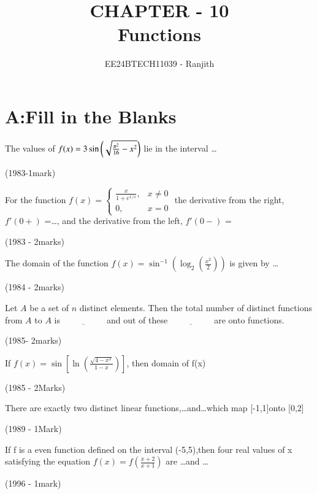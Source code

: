 \documentclass[journal,12pt,twocolumn]{IEEEtran}
\theoremstyle{remark}
\begin{document}

\vspace{3cm}

\title{CHAPTER - 10\\Functions}
\author{EE24BTECH11039 - Ranjith}
\maketitle
\newpage
\bigskip

\renewcommand{\thefigure}{\theenumi}
\renewcommand{\thetable}{\theenumi}


\section{A:Fill in the Blanks}


\begin{enumerate}
\item The values of $f(x)=3\sin\left(\sqrt{\frac{\pi^2}{16}-x^2}\right) $ lie in the interval \dots


\hfill
{(1983-1mark)}


 \item For the function $f(x) = \begin{cases} \frac{x}{1 + e^{1/x}}, & x \neq 0 \\ 0, & x = 0 \end{cases} $
the derivative from the right, $f'(0+)$ =\dots, and the derivative from the left, $f'(0-)$ =


 
\hfill
{(1983 - 2marks)}

\item{The domain of the function $f(x) =\sin^{-1}\left(\log_{2}\left(\frac{x^{2}}{2}\right)\right)$ is given by \ldots \


\hfill 
{(1984 - 2marks)}

\item Let \( A \) be a set of \( n \) distinct elements. Then the total number of distinct functions from \( A \) to \( A \) is \( \underline{\hspace{2cm}} \) and out of these \( \underline{\hspace{2cm}} \) are onto functions.

\hfill
{(1985- 2marks)}


\item If $f(x) = \sin \left[ \ln \left( \frac{\sqrt{4 - x^{2}}}{1 - x} \right) \right]$, { then domain of } f(x)  


\hfill
{(1985 - 2Marks)}

 
\item There are exactly two distinct linear functions,\dots and\dots which map [-1,1]onto [0,2]

\hfill
{(1989 - 1Mark)}



 \item If f is a even function defined on the 
interval (-5,5),then four real values of x 
satisfying the equation $f(x)=f({\frac{x+2}{x+1}})$
are \dots and \dots 


\hfill 
{(1996 - 1mark)}
}
\end{enumerate}
\end{document}
